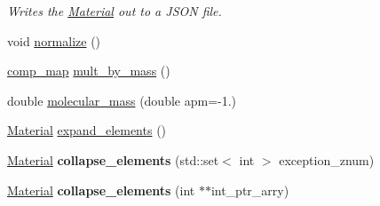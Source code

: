 \begin{DoxyCompactItemize}
\begin{DoxyCompactList}\small\item\em Writes the \hyperlink{classpyne_1_1_material}{Material} out to a J\-S\-O\-N file. \end{DoxyCompactList}\item 
void \hyperlink{classpyne_1_1_material_ad27e37568bc08020d3886bb6284bc61d}{normalize} ()
\item 
\hyperlink{namespacepyne_a86738cecccf4ce3f4ecc2ff6f45ce1a2}{comp\-\_\-map} \hyperlink{classpyne_1_1_material_ad561ad2e529cbdcc0c73b10b067289fd}{mult\-\_\-by\-\_\-mass} ()
\item 
double \hyperlink{classpyne_1_1_material_a5adf1c262bbabfadf5a8491e7a434ae5}{molecular\-\_\-mass} (double apm=-\/1.)
\item 
\hyperlink{classpyne_1_1_material}{Material} \hyperlink{classpyne_1_1_material_a1013d4217c99935396a5f3bc74722bd1}{expand\-\_\-elements} ()
\item 
\hypertarget{classpyne_1_1_material_a87cce5b3c63e3f74c3193db856727a8c}{\hyperlink{classpyne_1_1_material}{Material} {\bfseries collapse\-\_\-elements} (std\-::set$<$ int $>$ exception\-\_\-znum)}\label{classpyne_1_1_material_a87cce5b3c63e3f74c3193db856727a8c}

\item 
\hypertarget{classpyne_1_1_material_a58a9f43215bc0c4b826e234b2959a941}{\hyperlink{classpyne_1_1_material}{Material} {\bfseries collapse\-\_\-elements} (int $\ast$$\ast$int\-\_\-ptr\-\_\-arry)}\label{classpyne_1_1_material_a58a9f43215bc0c4b826e234b2959a941}


\end{DoxyCompactItemize}
